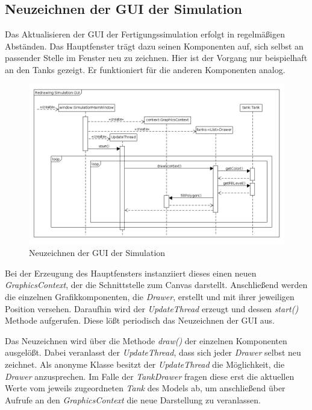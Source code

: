 \documentclass[parskip=full]{scrartcl}
\begin{document}
\subsection{Neuzeichnen der GUI der Simulation}
  Das Aktualisieren der GUI der Fertigungssimulation erfolgt in regelm\"a{\ss}igen Abst\"anden. Das Hauptfenster tr\"agt dazu seinen Komponenten auf,
  sich selbst an passender Stelle im Fenster neu zu zeichnen. Hier ist der Vorgang nur beispielhaft an den Tanks gezeigt. Er funktioniert
  f\"ur die anderen Komponenten analog.
  \begin{figure}[H]
    \centering
    \includegraphics[scale=0.35]{design/sequence-diagrams/simulation-redraw.png}
    \caption{Neuzeichnen der GUI der Simulation}
  \end{figure}
  Bei der Erzeugung des Hauptfensters instanziiert dieses einen neuen \emph{GraphicsContext}, der die Schnittstelle zum Canvas darstellt.
  Anschlie{\ss}end werden die einzelnen Grafikkomponenten, die \emph{Drawer}, erstellt und mit ihrer jeweiligen Position versehen.
  Daraufhin wird der \emph{UpdateThread} erzeugt und dessen \emph{start()} Methode aufgerufen. Diese l\"o{\ss}t periodisch das
  Neuzeichnen der GUI aus.

  Das Neuzeichnen wird \"uber die Methode \emph{draw()} der einzelnen Komponenten ausgel\"o{\ss}t. Dabei veranlasst der \emph{UpdateThread}, dass sich jeder \emph{Drawer}
  selbst neu zeichnet. Als anonyme Klasse besitzt der \emph{UpdateThread} die M\"oglichkeit, die \emph{Drawer} anzusprechen. Im Falle der 
  \emph{TankDrawer} fragen diese erst die aktuellen Werte vom jeweils zugeordneten \emph{Tank} des Models ab, um anschlie{\ss}end
  \"uber Aufrufe an den \emph{GraphicsContext} die neue Darstellung zu veranlassen.
\end{document}
